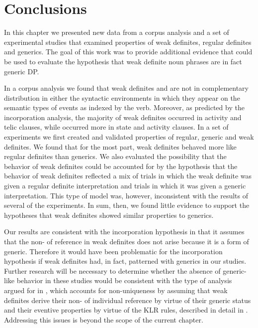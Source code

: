 \documentclass[output=paper,
modfonts
]{langscibook}
\begin{document}
\section{Conclusions} \label{sec:desaetal:5}

In this chapter we presented new data from a corpus analysis and a set of experimental studies that examined properties of weak definites, regular definites and generics. The goal of this work was to provide additional evidence that could be used to evaluate the hypothesis that weak definite noun phrases are in fact generic DP. 

In a corpus analysis we found that weak definites and  are not in complementary distribution in either the syntactic environments in which they appear on the semantic types of events as indexed by the verb.  Moreover, as predicted by the incorporation analysis, the majority of weak definites occurred in activity and telic clauses, while  occurred more in state and activity clauses. In a set of experiments we first created and validated properties of regular, generic and weak definites. We found that for the most part, weak definites behaved more like regular definites than generics. We also evaluated the possibility that the behavior of weak definites could be accounted for by the hypothesis that the behavior of weak definites reflected a mix of trials in which the weak definite was given a regular definite interpretation and trials in which it was given a generic interpretation. This type of model was, however, inconsistent with the results of several of the experiments. In sum, then, we found little evidence to support the hypotheses that weak definites showed similar properties to generics.

Our results are consistent with the incorporation hypothesis in that it assumes that the non- of reference in weak definites does not arise because it is a form of generic.  Therefore it would have been problematic for the incorporation hypothesis if weak definites had, in fact, patterned with generics in our studies. Further research will be necessary to determine whether the absence of generic-like behavior in these studies would be consistent with the type of analysis argued for in \citet{Aguilar-Guevara2014}, which accounts for non-uniqueness by assuming that weak definites derive their non- of individual reference by virtue of their generic status and their eventive properties by virtue of the KLR rules, described in detail in \citet{Aguilar-Guevara2014}.  Addressing this issues is beyond the scope of the current chapter.
\end{document}
